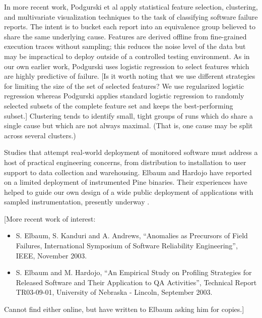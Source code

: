 \documentclass{acm_proc_article-sp}
\newcommand{\placeholder}[1]{{\color[cmyk]{0,0.61,0.87,0}[#1]}}
\begin{document}
In more recent work, Podgurski et al \cite{ICSE`03*465} apply
statistical feature selection, clustering, and multivariate
visualization techniques to the task of classifying software failure
reports.  The intent is to bucket each report into an equivalence
group believed to share the same underlying cause.  Features are
derived offline from fine-grained execution traces without sampling;
this reduces the noise level of the data but may be impractical to
deploy outside of a controlled testing environment.  As in our own
earlier work, Podgurski uses logistic regression to select features
which are highly predictive of failure.  \placeholder{Is it worth
  noting that we use different strategies for limiting the size of the
  set of selected features?  We use regularized logistic regression
  whereas Podgurski applies standard logistic regression to randomly
  selected subsets of the complete feature set and keeps the
  best-performing subset.}  Clustering tends to identify small, tight
groups of runs which do share a single cause but which are not always
maximal.  (That is, one cause may be split across several clusters.)

Studies that attempt real-world deployment of monitored software must
address a host of practical engineering concerns, from distribution to
installation to user support to data collection and warehousing.
Elbaum and Hardojo \cite{Elbaum:2003:DISATA} have reported on a
limited deployment of instrumented Pine binaries.  Their experiences
have helped to guide our own design of a wide public deployment of
applications with sampled instrumentation, presently underway
\cite{Liblit:2003:CBIP}.

\placeholder{More recent work of interest:

  \begin{itemize}
  \item S. Elbaum, S.  Kanduri and A. Andrews, ``Anomalies as
    Precursors of Field Failures, International Symposium of Software
    Reliability Engineering'', IEEE, November 2003.
    
  \item S. Elbaum and M. Hardojo, ``An Empirical Study on Profiling
    Strategies for Released Software and Their Application to QA
    Activities'', Technical Report TR03-09-01, University of Nebraska
    - Lincoln, September 2003.
  \end{itemize}
  
  Cannot find either online, but have written to Elbaum asking him for
  copies.}
\end{document}
